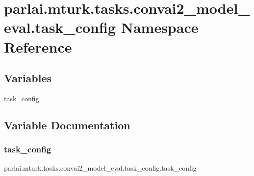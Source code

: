 \hypertarget{namespaceparlai_1_1mturk_1_1tasks_1_1convai2__model__eval_1_1task__config}{}\section{parlai.\+mturk.\+tasks.\+convai2\+\_\+model\+\_\+eval.\+task\+\_\+config Namespace Reference}
\label{namespaceparlai_1_1mturk_1_1tasks_1_1convai2__model__eval_1_1task__config}
\subsection*{Variables}
\begin{DoxyCompactItemize}
\item 
\hyperlink{namespaceparlai_1_1mturk_1_1tasks_1_1convai2__model__eval_1_1task__config_abc274ac825f6cff86523283290108e62}{task\+\_\+config}
\end{DoxyCompactItemize}


\subsection{Variable Documentation}
\mbox{\label{namespaceparlai_1_1mturk_1_1tasks_1_1convai2__model__eval_1_1task__config_abc274ac825f6cff86523283290108e62}} 
\subsubsection{\texorpdfstring{task\+\_\+config}{task\_config}}
{\footnotesize\ttfamily parlai.\+mturk.\+tasks.\+convai2\+\_\+model\+\_\+eval.\+task\+\_\+config.\+task\+\_\+config}

